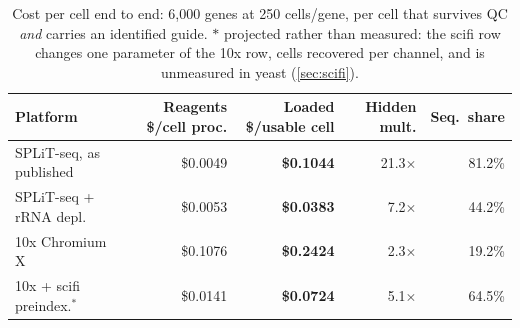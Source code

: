 \begin{table}[htbp]\centering
\footnotesize
\caption[]{Cost per cell end to end: 6{,}000 genes at 250 cells/gene, per cell that survives QC \emph{and} carries an identified guide. $\ast$ projected rather than measured: the scifi row changes one parameter of the 10x row, cells recovered per channel, and is unmeasured in yeast (\cref{sec:scifi}).}\label{tab:cost-loaded}
\begin{tabular}{lrrrr}
\toprule
Platform & Reagents \$/cell proc. & Loaded \$/usable cell & Hidden mult. & Seq.\ share \\
\midrule
SPLiT-seq, as published & \$0.0049 & \textbf{\$0.1044} & 21.3$\times$ & 81.2\% \\
SPLiT-seq + rRNA depl. & \$0.0053 & \textbf{\$0.0383} & 7.2$\times$ & 44.2\% \\
10x Chromium X & \$0.1076 & \textbf{\$0.2424} & 2.3$\times$ & 19.2\% \\
10x + scifi preindex.$^{\ast}$ & \$0.0141 & \textbf{\$0.0724} & 5.1$\times$ & 64.5\% \\
\bottomrule
\end{tabular}
\end{table}
